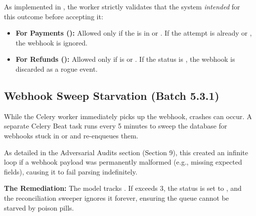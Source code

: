 As implemented in , the worker strictly validates that the system \textit{intended} for this outcome before accepting it:
\begin{itemize}
    \item \textbf{For Payments ():} Allowed only if the  is in  or . If the attempt is already  or , the webhook is ignored.
    \item \textbf{For Refunds ():} Allowed only if  is  or . If the status is , the webhook is discarded as a rogue event.
\end{itemize}

\vspace{0.8cm}

\subsection{Webhook Sweep Starvation (Batch 5.3.1)}

While the Celery worker immediately picks up the webhook, crashes can occur. A separate  Celery Beat task runs every 5 minutes to sweep the database for webhooks stuck in  or  and re-enqueues them.

As detailed in the Adversarial Audits section (Section 9), this created an infinite loop if a webhook payload was permanently malformed (e.g., missing expected fields), causing it to fail parsing indefinitely.

\textbf{The Remediation:} The  model tracks . If  exceeds 3, the status is set to , and the reconciliation sweeper ignores it forever, ensuring the queue cannot be starved by poison pills.
